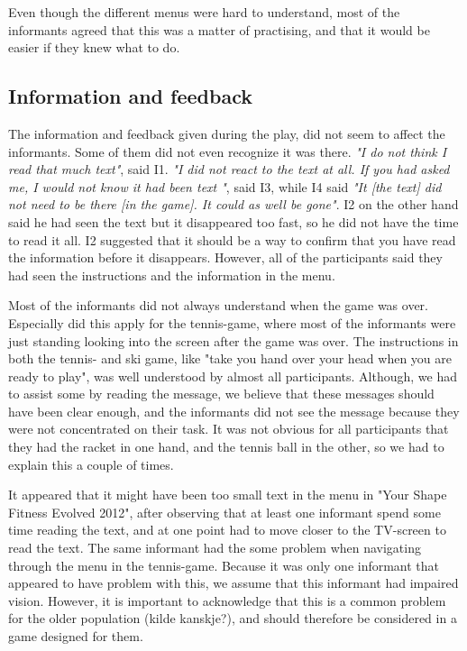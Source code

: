 Even though the different menus were hard to understand, most of the informants agreed that this was a matter of practising, and that it would be easier if they knew what to do. 

\subsection{Information and feedback}
The information and feedback given during the play, did not seem to affect the informants. Some of them did not even recognize it was there. \emph{"I do not think I read that much text"}, said I1. \emph{"I did not react to the text at all. If you had asked me, I would not know it had been text
"}, said I3, while I4 said \emph{"It [the text] did not need to be there [in the game]. It could as well be gone"}. I2 on the other hand said he had seen the text but it disappeared too fast, so he did not have the time to read it all. I2 suggested that it should be a way to confirm that you have read the information before it disappears. However, all of the participants said they had seen the instructions and the information in the menu. 

Most of the informants did not always understand when the game was over. Especially did this apply for the tennis-game, where most of the informants were just standing looking into the screen after the game was over.  The instructions in both the tennis- and ski game, like "take you hand over your head when you are ready to play", was well understood by almost all participants. Although, we had to assist some by reading the message, we believe that these messages should have been clear enough, and the informants did not see the message because they were not concentrated on their task. It was not obvious for all participants that they had the racket in one hand, and the tennis ball in the other, so we had to explain this a couple of times. 

It appeared that it might have been too small text in the menu in "Your Shape Fitness Evolved 2012", after observing that at least one informant spend some time reading the text, and at one point had to move closer to the TV-screen to read the text. The same informant had the some problem when navigating through the menu in the tennis-game. Because it was only one informant that appeared to have problem with this, we assume that this informant had impaired vision. However, it is important to acknowledge that this is a common problem for the older population (kilde kanskje?), and should therefore be considered in a game designed for them. 

